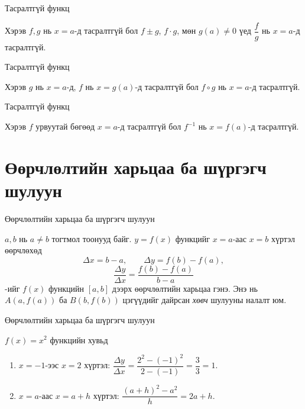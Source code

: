 \begin{frame}[allowframebreaks]{Тасралтгүй функц}
\begin{theorem} Хэрэв $f, g$ нь $x=a$-д тасралтгүй бол $f\pm g$, $f\cdot g$, мөн $g(a)\ne 0$ үед $\dfrac{f}{g}$ нь $x=a$-д тасралтгүй.
\end{theorem}
\end{frame}

\begin{frame}[allowframebreaks]{Тасралтгүй функц}
\begin{theorem}[Композици] Хэрэв $g$ нь $x=a$-д, $f$ нь $x=g(a)$-д тасралтгүй бол $f\circ g$ нь $x=a$-д тасралтгүй.
\end{theorem}
\end{frame}

\begin{frame}[allowframebreaks]{Тасралтгүй функц}
\begin{theorem} Хэрэв $f$ урвуутай бөгөөд $x=a$-д тасралтгүй бол $f^{-1}$ нь $x=f(a)$-д тасралтгүй.
\end{theorem}
\end{frame}

\section{Өөрчлөлтийн харьцаа ба шүргэгч шулуун}
\begin{frame}[allowframebreaks]{Өөрчлөлтийн харьцаа ба шүргэгч шулуун}
\begin{definition}
$a,b$ нь $a\ne b$ тогтмол тоонууд байг. $y=f(x)$ функцийг $x=a$-аас $x=b$ хүртэл өөрчлөхөд
\[
\Delta x=b-a,\qquad \Delta y=f(b)-f(a),
\]
\[
\frac{\Delta y}{\Delta x}=\frac{f(b)-f(a)}{b-a}
\]
-ийг $f(x)$ функцийн $[a,b]$ дээрх өөрчлөлтийн харьцаа гэнэ. Энэ нь $A(a,f(a))$ ба $B(b,f(b))$ цэгүүдийг дайрсан \emph{хөвч} шулууны налалт юм.
\end{definition}
\end{frame}

\begin{frame}[allowframebreaks]{Өөрчлөлтийн харьцаа ба шүргэгч шулуун}
\begin{example}
$f(x)=x^2$ функцийн хувьд
\begin{enumerate}
  \item $x=-1$-ээс $x=2$ хүртэл: $\dfrac{\Delta y}{\Delta x}=\dfrac{2^2-(-1)^2}{2-(-1)}=\dfrac{3}{3}=1$.
  \item $x=a$-аас $x=a+h$ хүртэл: $\dfrac{(a+h)^2-a^2}{h}=2a+h$.
\end{enumerate}
\end{example}
\end{frame}

